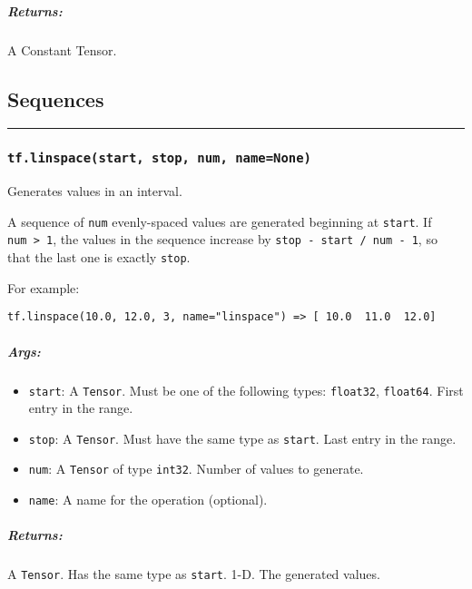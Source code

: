 \subparagraph{Returns: }\label{returns-5}

A Constant Tensor.

\subsection{Sequences }\label{sequences}

\begin{center}\rule{0.5\linewidth}{\linethickness}\end{center}

\subsubsection{\texorpdfstring{\texttt{tf.linspace(start,\ stop,\ num,\ name=None)}
}{tf.linspace(start, stop, num, name=None) }}\label{tf.linspacestart-stop-num-namenone}

Generates values in an interval.

A sequence of \texttt{num} evenly-spaced values are generated beginning
at \texttt{start}. If \texttt{num\ \textgreater{}\ 1}, the values in the
sequence increase by \texttt{stop\ -\ start\ /\ num\ -\ 1}, so that the
last one is exactly \texttt{stop}.

For example:

\begin{verbatim}
tf.linspace(10.0, 12.0, 3, name="linspace") => [ 10.0  11.0  12.0]
\end{verbatim}

\subparagraph{Args: }\label{args-6}

\begin{itemize}
\tightlist
\item
  \texttt{start}: A \texttt{Tensor}. Must be one of the following types:
  \texttt{float32}, \texttt{float64}. First entry in the range.
\item
  \texttt{stop}: A \texttt{Tensor}. Must have the same type as
  \texttt{start}. Last entry in the range.
\item
  \texttt{num}: A \texttt{Tensor} of type \texttt{int32}. Number of
  values to generate.
\item
  \texttt{name}: A name for the operation (optional).
\end{itemize}

\subparagraph{Returns: }\label{returns-6}

A \texttt{Tensor}. Has the same type as \texttt{start}. 1-D. The
generated values.

